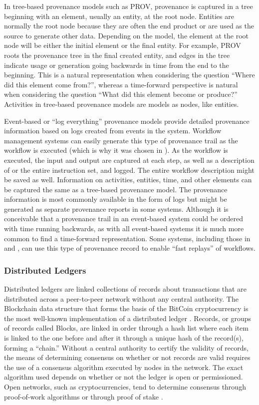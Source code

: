 In tree-based provenance models such as PROV, provenance is captured in a tree
beginning with an element, usually an entity, at the root node. Entities are
normally the root node because they are often the end product or are used as the
source to generate other data. Depending on the model, the element at the root
node will be either the initial element or the final entity. For example, PROV
roots the provenance tree in the final created entity, and edges in the tree
indicate usage or generation going backwards in time from the end to the
beginning. This is a natural representation when considering the question
``Where did this element come from?'', whereas a time-forward perspective is
natural when considering the question ``What did this element become or
produce?'' Activities in tree-based provenance models are models as nodes, like
entities.

Event-based or ``log everything'' provenance models provide detailed provenance
information based on logs created from events in the system. Workflow management
systems can easily generate this type of provenance trail as the workflow is
executed (which is why it was chosen in \cite{billings_eclipse_2017}). As the
workflow is executed, the input and output are captured at each step, as well as
a description of or the entire instruction set, and logged. The entire workflow
description might be saved as well. Information on activities, entities, time,
and other elements can be captured the same as a tree-based provenance model.
The provenance information is most commonly available in the form of logs but
might be generated as separate provenance reports in some systems. Although it
is conceivable that a provenance trail in an event-based system could be ordered
with time running backwards, as with all event-based systems it is much more
common to find a time-forward representation. Some systems, including those in
\cite{billings_eclipse_2017} and \cite{altintas_provenance_2006}, can use this
type of provenance record to enable ``fast replays'' of workflows.

\subsubsection{Distributed Ledgers}
Distributed ledgers are linked collections of records about transactions that
are distributed across a peer-to-peer network without any central authority. The
Blockchain data structure that forms the basis of the BitCoin cryptocurrency is
the most well-known implementation of a distributed ledger
\cite{nakamoto_bitcoin:_nodate}. Records, or groups of records called Blocks,
are linked in order through a hash list where each item is linked to the one
before and after it through a unique hash of the record(s), forming a ``chain.''
Without a central authority to certify the validity of records, the means of
determining consensus on whether or not records are valid requires the use of a
consensus algorithm executed by nodes in the network. The exact algorithm used
depends on whether or not the ledger is open or permissioned. Open networks,
such as cryptocurrencies, tend to determine consensus through proof-of-work
algorithms \cite{nakamoto_bitcoin:_nodate} or through proof of stake
\cite{noauthor_proof--stake_2018}.

